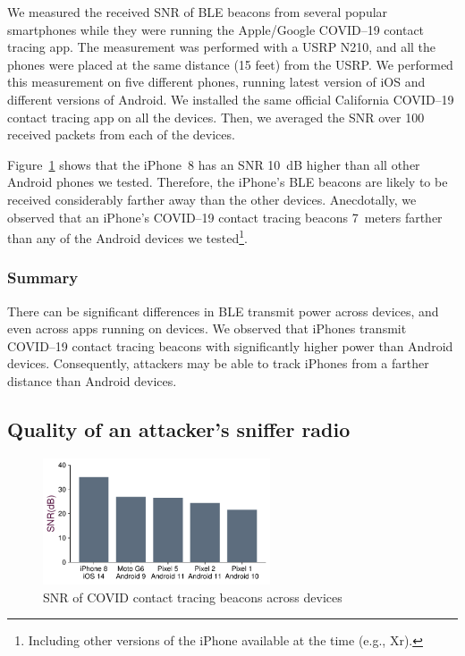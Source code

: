 We measured the received SNR of BLE beacons from several popular smartphones while they were
running the Apple/Google COVID--19 contact tracing app.  The measurement was
performed with a USRP N210, and all the phones were placed at the same distance (15 feet) from the
USRP. We performed this measurement on five different phones, running latest
version of iOS and different versions of Android. We installed the same
official California COVID--19 contact tracing app on all the devices. Then,
we averaged the SNR over 100 received packets
from each of the devices.

Figure~\ref{fig:txpwr} shows that the iPhone~8 has an SNR 10~dB higher
than all other Android phones we tested. Therefore, the iPhone's BLE beacons
are likely to be received considerably farther away than the other devices.
Anecdotally, we observed that an iPhone's COVID--19 contact tracing beacons
7~meters farther than any of the Android devices we tested\footnote{Including other versions of the iPhone available at the time (e.g., Xr).}.

\subsubsection*{Summary} There can be significant differences in BLE transmit power
across devices, and even across apps running on devices. We observed
that iPhones transmit COVID--19 contact tracing beacons with significantly higher
power than Android devices.  Consequently, attackers may be able to track
iPhones from a farther distance than Android devices.

\subsection{Quality of an attacker's sniffer radio} %
    \label{sec:hadi:sdr}

\begin{figure}
    \centering
    \captionsetup{justification=centering}
    \includegraphics[width=0.6\textwidth]{bletracking/plots/phone_power_barplot}
    \caption{SNR of COVID contact tracing beacons across devices}
    \label{fig:txpwr}
    \end{figure}
    

